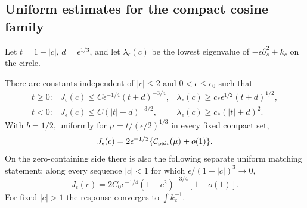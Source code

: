 \subsection{Uniform estimates for the compact cosine family}
Let $t=1-|c|$, $d=\epsilon^{1/3}$, and let
$\lambda_\epsilon(c)$ be the lowest eigenvalue of
$-\epsilon\partial_s^2+k_c$ on the circle.
\begin{lemma}\label{lem:cosine-uniform}
There are constants independent of $|c|\le2$ and $0<\epsilon\le\epsilon_0$
such that
\begin{equation}\label{eq:cosine-bounds}
 \begin{array}{lll}
 t\ge0:&J_\epsilon(c)\le C\epsilon^{-1/4}(t+d)^{-3/4},&
 \lambda_\epsilon(c)\ge c_*\epsilon^{1/2}(t+d)^{1/2},\\[2pt]
 t<0:&J_\epsilon(c)\le C(|t|+d)^{-3/2},&
 \lambda_\epsilon(c)\ge c_*(|t|+d)^2.
 \end{array}
\end{equation}
With $b=1/2$, uniformly for $\mu=t/(\epsilon/2)^{1/3}$ in every
fixed compact set,
\begin{equation}\label{eq:cosine-fold-limit}
 J_\epsilon(c)=2\epsilon^{-1/2}
                    \{\mathcal C_{\rm pair}(\mu)+o(1)\}.
\end{equation}
On the zero-containing side there is also the following separate
uniform matching statement: along every sequence $|c|<1$ for which
$\epsilon/(1-|c|)^3\to0$,
\begin{equation}\label{eq:cosine-separated}
 J_\epsilon(c)=2C_0\epsilon^{-1/4}(1-c^2)^{-3/4}[1+o(1)].
\end{equation}
For fixed $|c|>1$ the response converges to $\int k_c^{-1}$.
\end{lemma}
